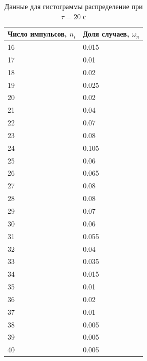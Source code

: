 \documentclass[a4paper]{article}
\begin{document}
\begin{table}[!h]
\begin{center}
\begin{tabular}{|l|l|}
\hline
Число импульсов, $n_{i}$ & Доля случаев, $\omega_{n}$ \\ \hline
16                       & 0.015                      \\ \hline
17                       & 0.01                       \\ \hline
18                       & 0.02                       \\ \hline
19                       & 0.025                      \\ \hline
20                       & 0.02                       \\ \hline
21                       & 0.04                       \\ \hline
22                       & 0.07                       \\ \hline
23                       & 0.08                       \\ \hline
24                       & 0.105                      \\ \hline
25                       & 0.06                       \\ \hline
26                       & 0.065                      \\ \hline
27                       & 0.08                       \\ \hline
28                       & 0.08                       \\ \hline
29                       & 0.07                       \\ \hline
30                       & 0.06                       \\ \hline
31                       & 0.055                      \\ \hline
32                       & 0.04                       \\ \hline
33                       & 0.035                      \\ \hline
34                       & 0.015                      \\ \hline
35                       & 0.01                       \\ \hline
36                       & 0.02                       \\ \hline
37                       & 0.01                       \\ \hline
38                       & 0.005                      \\ \hline
39                       & 0.005                      \\ \hline
40                       & 0.005                      \\ \hline
\end{tabular}
\caption{Данные для гистограммы распределение при $\tau = 20$ с}
\end{center}
\end{table}
\end{document}

